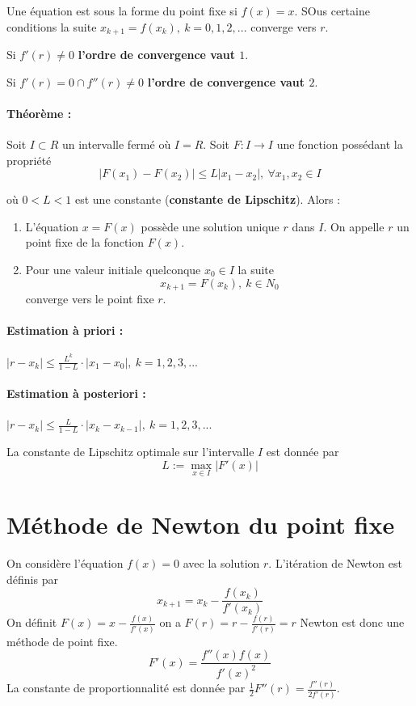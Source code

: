 \documentclass[a4paper,9pt]{extarticle}
\begin{document}
\begin{multicols*}{2}
Une équation est sous la forme du point fixe si $f(x)=x$. SOus certaine conditions la suite $x_{k+1}=f(x_k),\ k=0,1,2,...$ converge vers $r$.

Si $f'(r)\neq 0$ \textbf{l'ordre de convergence vaut $1$}.

Si $f'(r)=0 \cap f''(r)\neq 0$ \textbf{l'ordre de convergence vaut $2$}.

\paragraph*{Théorème :} Soit $I\subset R$ un intervalle fermé où $I=R$. Soit $F:I\rightarrow I$ une fonction possédant la propriété
$$
|F(x_1)-F(x_2)| \leq L|x_1-x_2|,\ \forall x_1,x_2\in I
$$

où $0 < L < 1$ est une constante (\textbf{constante de Lipschitz}). Alors :
\begin{enumerate}
    \item L'équation $x=F(x)$ possède une solution unique $r$ dans $I$. On appelle $r$ un point fixe de la fonction $F(x)$.
    \item Pour une valeur initiale quelconque $x_0\in I$ la suite
    $$
    x_{k+1}=F(x_k), \ k\in N_0
    $$
    converge vers le point fixe $r$.
\end{enumerate}

\paragraph*{Estimation à priori :} $|r-x_k|\leq \frac{L^k}{1-L}\cdot |x_1-x_0|, \ k=1,2,3,...$
\paragraph*{Estimation à posteriori :} $|r-x_k| \leq \frac{L}{1-L}\cdot |x_k-x_{k-1}|, \ k=1,2,3,...$

La constante de Lipschitz optimale sur l'intervalle $I$ est donnée par
$$
L:=\max_{x\in I}|F'(x)|
$$

\section{Méthode de Newton du point fixe}

On considère l'équation $f(x)=0$ avec la solution $r$. L'itération de Newton est définis par
$$
x_{k+1}=x_k-\frac{f(x_k)}{f'(x_k)}
$$
On définit $F(x)=x-\frac{f(x)}{f'(x)}$ on a $F(r)=r-\frac{f(r)}{f'(r)}=r$ Newton est donc une méthode de point fixe.
$$
F'(x)=\frac{f''(x)f(x)}{f'(x)^2}
$$
La constante de proportionnalité est donnée par $\frac{1}{2}F''(r)=\frac{f''(r)}{2f'(r)}$.


\end{multicols*}
\end{document}
